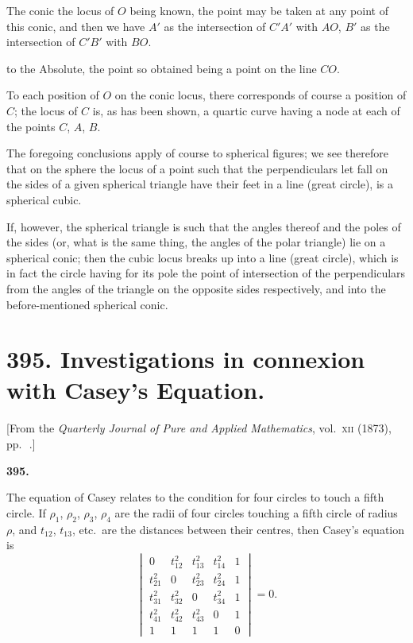 \documentclass[11pt,a4paper]{article}
\theoremstyle{plain}
\begin{document}
The conic the locus of $O$ being known, the point may be taken at any point of this conic, and then we have $A'$ as the intersection of $C'A'$ with $AO$, $B'$ as the intersection of $C'B'$ with $BO$.

\newpage
\setcounter{equation}{35}

to the Absolute, the point so obtained being a point on the line $CO$.

To each position of $O$ on the conic locus, there corresponds of course a position of $C$; the locus of $C$ is, as has been shown, a quartic curve having a node at each of the points $C$, $A$, $B$.

The foregoing conclusions apply of course to spherical figures; we see therefore that on the sphere the locus of a point such that the perpendiculars let fall on the sides of a given spherical triangle have their feet in a line (great circle), is a spherical cubic.

If, however, the spherical triangle is such that the angles thereof and the poles of the sides (or, what is the same thing, the angles of the polar triangle) lie on a spherical conic; then the cubic locus breaks up into a line (great circle), which is in fact the circle having for its pole the point of intersection of the perpendiculars from the angles of the triangle on the opposite sides respectively, and into the before-mentioned spherical conic.

\newpage

\section*{395. Investigations in connexion with Casey's Equation.}
\label{sec:395}
\begin{center}
[From the \textit{Quarterly Journal of Pure and Applied Mathematics}, vol.~\textsc{xii} (1873), pp.~\,.]
\end{center}

\setcounter{equation}{0}

\textbf{395.}

The equation of Casey relates to the condition for four circles to touch a fifth circle. If $\rho_1$, $\rho_2$, $\rho_3$, $\rho_4$ are the radii of four circles touching a fifth circle of radius $\rho$, and $t_{12}$, $t_{13}$, etc.~are the distances between their centres, then Casey's equation is
\begin{equation}
\begin{vmatrix}
0 & t_{12}^2 & t_{13}^2 & t_{14}^2 & 1 \\
t_{21}^2 & 0 & t_{23}^2 & t_{24}^2 & 1 \\
t_{31}^2 & t_{32}^2 & 0 & t_{34}^2 & 1 \\
t_{41}^2 & t_{42}^2 & t_{43}^2 & 0 & 1 \\
1 & 1 & 1 & 1 & 0
\end{vmatrix} = 0.
\end{equation}
\end{document}
